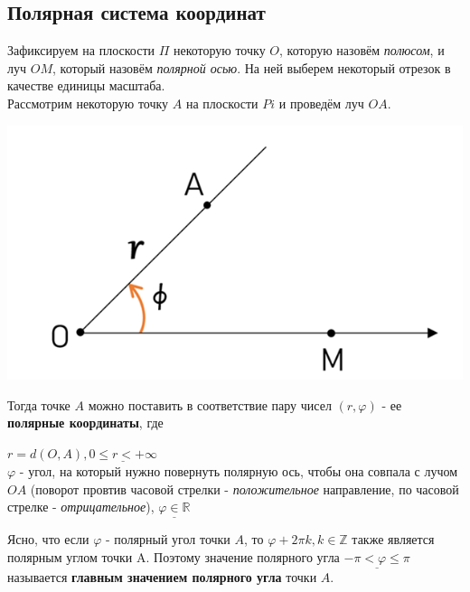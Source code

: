 \documentclass[a4paper, 12pt]{report}
\begin{document}
	\subsection{Полярная система координат}
	\quad{} Зафиксируем на плоскости $\Pi$ некоторую точку $O$, которую назовём \textit{полюсом}, и луч $OM$, который назовём \textit{полярной осью}. На ней выберем некоторый отрезок в качестве единицы масштаба.\\
	
	Рассмотрим некоторую точку $A$ на плоскости $Pi$ и проведём луч $OA$. 
	\begin{center}
		\includegraphics{img/1.2.2 polar axis.png}
	\end{center}
	Тогда точке $A$ можно поставить в соответствие пару чисел $(r, \varphi)$ - ее \textbf{полярные координаты}, где
	\begin{center}
		$r = d(O, A), \underline{0 \le r < +\infty}$\\
		$\varphi$ - угол, на который нужно повернуть полярную ось, чтобы она совпала с лучом $OA$
		(поворот провтив часовой стрелки - \textit{положительное} направление, по часовой стрелке - \textit{отрицательное}), $\underline{\varphi \in \mathbb{R}}$
	\end{center}
	
	Ясно, что если $\varphi$ - полярный угол точки $A$, то $\varphi + 2\pi k, k \in \mathbb{Z}$ также является полярным углом точки A. Поэтому значение полярного угла $\underline{-\pi < \varphi \le \pi}$ называется \textbf{главным значением полярного угла} точки $A$.
	
\end{document}
